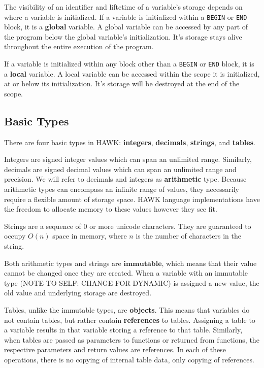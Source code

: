\documentclass[12pt]{article}
\begin{document}
The visibility of an identifier and liftetime of a variable's storage depends on where a variable is initialized. If a variable is initialized within a \texttt{BEGIN} or \texttt{END} block, it is a \textbf{global} variable. A global variable can be accessed by any part of the program below the global variable's initialization. It's storage stays alive throughout the entire execution of the program.

If a variable is initialized within any block other than a \texttt{BEGIN} or \texttt{END} block, it is a \textbf{local} variable. A local variable can be accessed within the scope it is initialized, at or below its initialization. It's storage will be destroyed at the end of the scope.

\subsection*{Basic Types}

There are four basic types in HAWK: \textbf{integers}, \textbf{decimals}, \textbf{strings}, and \textbf{tables}. 

Integers are signed integer values which can span an unlimited range. Similarly, decimals are signed decimal values which can span an unlimited range and precision. We will refer to decimals and integers as \textbf{arithmetic} type. Because arithmetic types can encompass an infinite range of values, they necessarily require a flexible amount of storage space. HAWK language implementations have the freedom to allocate memory to these values however they see fit.

Strings are a sequence of 0 or more unicode characters. They are guaranteed to occupy $O(n)$ space in memory, where $n$ is the number of characters in the string.

Both arithmetic types and strings are $\textbf{immutable}$, which means that their value cannot be changed once they are created. When a variable with an immutable type (NOTE TO SELF: CHANGE FOR DYNAMIC) is assigned a new value, the old value and underlying storage are destroyed. 

Tables, unlike the immutable types, are \textbf{objects}. This means that variables do not contain tables, but rather contain \textbf{references} to tables. Assigning a table to a variable results in that variable storing a reference to that table. Similarly, when tables are passed as parameters to functions or returned from functions, the respective parameters and return values are references. In each of these operations, there is no copying of internal table data, only copying of references. 
\end{document}
